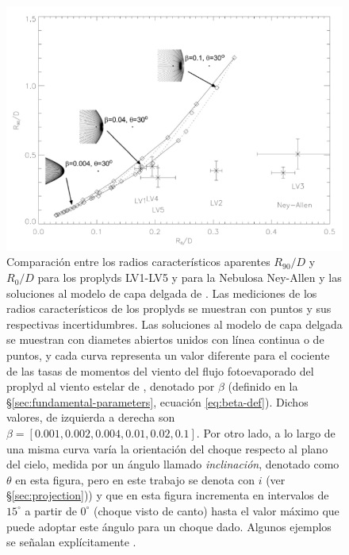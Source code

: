 \begin{figure}
  \centering
  \includegraphics[width=0.9\linewidth]{./Figures/robberto}
  \caption{Comparación entre los radios característicos aparentes $R_{90}/D$ y $R_0/D$ para los proplyds LV1-LV5 y para la Nebulosa Ney-Allen y las soluciones al modelo de capa delgada de \citep{Canto:1996}. Las mediciones de los radios característicos de los proplyds se muestran con puntos y sus respectivas incertidumbres. Las soluciones al modelo de capa delgada se muestran con diametes abiertos unidos con línea continua o de puntos, y cada curva representa un valor diferente para el cociente de las tasas de momentos del viento del flujo fotoevaporado del proplyd al viento estelar de \thC{}, denotado por $\beta$ (definido en la \S \ref{sec:fundamental-parameters}, ecuación \ref{eq:beta-def}). Dichos valores, de izquierda a derecha son $\beta=[0.001, 0.002, 0.004, 0.01, 0.02, 0.1]$. Por otro lado, a lo largo de una misma curva varía la orientación del choque respecto al plano del cielo, medida por un ángulo llamado \textit{inclinación}, denotado como $\theta$ en esta figura, pero en este trabajo se denota con $i$ (ver \S \ref{sec:projection})) y que en esta figura incrementa en intervalos de $15^\circ$ a partir de $0^\circ$ (choque visto de canto) hasta el valor máximo que puede adoptar este ángulo para un choque dado. Algunos ejemplos se señalan explícitamente \citep{Robberto:2005}.}
  \label{fig:Robberto}
\end{figure}

